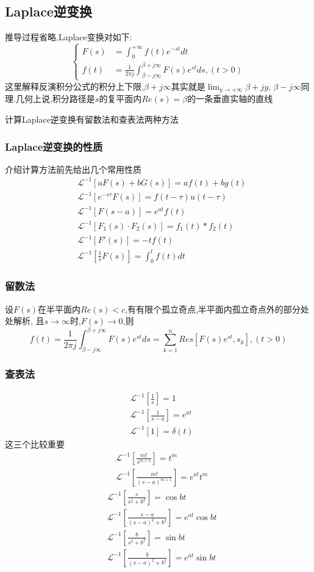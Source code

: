 \documentclass[12pt, a4paper, oneside]{ctexart}
\begin{document}
\subsection{Laplace逆变换}
推导过程省略,Laplace变换对如下:
\[
\begin{cases}
    F(s) &= \int_{0}^{+\infty}f(t)e^{-st}dt\\
    f(t) &= \frac{1}{2\pi j}\int_{\beta-j\infty}^{\beta+j\infty}F(s)e^{st}ds,(t>0)
\end{cases}
\]
这里解释反演积分公式的积分上下限,$\beta+j\infty$其实就是$\lim_{y\to +\infty}\beta+jy$,
$\beta-j\infty$同理.几何上说,积分路径是$s$的复平面内$Re(s)=\beta$的一条垂直实轴的直线

计算Laplace逆变换有留数法和查表法两种方法
\subsubsection{Laplace逆变换的性质}
介绍计算方法前先给出几个常用性质
\begin{align*}
    &\mathcal{L}^{-1}\left[aF(s)+bG(s)\right]=af(t)+bg(t)\\
    &\mathcal{L}^{-1}\left[e^{-s\tau}F(s)\right]=f(t-\tau)u(t-\tau)\\
    &\mathcal{L}^{-1}\left[F(s-a)\right]=e^{at}f(t)\\
    &\mathcal{L}^{-1}\left[F_1(s)\cdot F_2(s)\right]=f_1(t)*f_2(t)\\
    &\mathcal{L}^{-1}\left[F'(s)\right]=-tf(t)\\
    &\mathcal{L}^{-1}\left[\frac{1}{s}F(s)\right]=\int_{0}^{t}f(t)dt
\end{align*}
\subsubsection{留数法}
设$F(s)$在半平面内$Re(s)<c$,有有限个孤立奇点,半平面内孤立奇点外的部分处处解析,
且$s\to\infty$时,$F(s)\to 0$,则
\[
    f(t) = \frac{1}{2\pi j}\int_{\beta-j\infty}^{\beta+j\infty}F(s)e^{st}ds
    = \sum_{k=1}^{n}Res[F(s)e^{st}, s_k],(t>0)
\]
\subsubsection{查表法}
\begin{align*}
    &\mathcal{L}^{-1}[\frac{1}{s}]=1\\
    &\mathcal{L}^{-1}[\frac{1}{s-a}]=e^{at}\\
    &\mathcal{L}^{-1}[1]=\delta(t)
\end{align*}
这三个比较重要
\begin{align*}
    &\mathcal{L}^{-1}[\frac{m!}{s^{m+1}}]=t^m\\
    &\mathcal{L}^{-1}[\frac{m!}{(s-a)^{m+1}}]=e^{at}t^m
\end{align*}
\begin{align*}
    &\mathcal{L}^{-1}[\frac{s}{s^2+b^2}]=\cos bt\\
    &\mathcal{L}^{-1}[\frac{s-a}{(s-a)^2+b^2}]=e^{at}\cos bt\\
    &\mathcal{L}^{-1}[\frac{b}{s^2+b^2}]=\sin bt\\
    &\mathcal{L}^{-1}[\frac{b}{(s-a)^2+b^2}]=e^{at}\sin bt
\end{align*}
\end{document}
